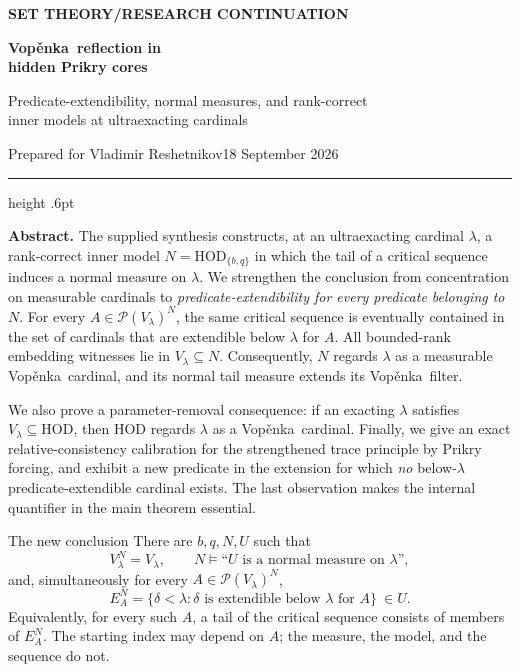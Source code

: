 \documentclass[11pt,letterpaper]{article}
\theoremstyle{definition}
\numberwithin{equation}{section}
\newcommand{\HOD}{\mathrm{HOD}}
\newcommand{\Pow}{\mathcal P}
\newcommand{\Vop}{Vop\v{e}nka}
\begin{document}
\thispagestyle{empty}
{\sffamily\bfseries\small\color{Olive}SET THEORY\quad /\quad RESEARCH CONTINUATION}

\vspace{13pt}
{\fontsize{28}{31}\selectfont\bfseries\color{Forest}\Vop\ reflection in\\ hidden Prikry cores\par}
\vspace{10pt}
{\fontsize{14}{18}\selectfont Predicate-extendibility, normal measures, and rank-correct\\ inner models at ultraexacting cardinals\par}
\vspace{14pt}
{\color{Muted}Prepared for Vladimir Reshetnikov\hfill 18 September 2026\par}
\vspace{3pt}
{\color{Sage}\hrule height .6pt}
\vspace{12pt}

\textbf{Abstract.}
The supplied synthesis constructs, at an ultraexacting cardinal $\lambda$, a rank-correct inner model $N=\HOD_{\{b,q\}}$ in which the tail of a critical sequence induces a normal measure on $\lambda$. We strengthen the conclusion from concentration on measurable cardinals to \emph{predicate-extendibility for every predicate belonging to $N$}. For every $A\in\Pow(V_\lambda)^N$, the same critical sequence is eventually contained in the set of cardinals that are extendible below $\lambda$ for $A$. All bounded-rank embedding witnesses lie in $V_\lambda\subseteq N$. Consequently, $N$ regards $\lambda$ as a measurable \Vop\ cardinal, and its normal tail measure extends its \Vop\ filter.

We also prove a parameter-removal consequence: if an exacting $\lambda$ satisfies $V_\lambda\subseteq\HOD$, then $\HOD$ regards $\lambda$ as a \Vop\ cardinal. Finally, we give an exact relative-consistency calibration for the strengthened trace principle by Prikry forcing, and exhibit a new predicate in the extension for which \emph{no} below-$\lambda$ predicate-extendible cardinal exists. The last observation makes the internal quantifier in the main theorem essential.

\begin{assessment}{The new conclusion}
There are $b,q,N,U$ such that
\[
 V_\lambda^N=V_\lambda,\qquad
 N\models\text{``$U$ is a normal measure on $\lambda$''},
\]
and, simultaneously for every $A\in\Pow(V_\lambda)^N$,
\[
 E_A^N=\{\delta<\lambda:\delta\text{ is extendible below $\lambda$ for }A\}
 \ \in U.
\]
Equivalently, for every such $A$, a tail of the critical sequence consists of members of $E_A^N$. The starting index may depend on $A$; the measure, the model, and the sequence do not.
\end{assessment}
\end{document}
